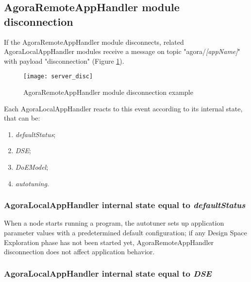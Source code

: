 \subsection{AgoraRemoteAppHandler module disconnection}\label{handler_disc}

If the AgoraRemoteAppHandler module disconnects, related AgoraLocalAppHandler modules receive a message on topic "agora\slash{}\textit{[appName]}" with payload "disconnection" (Figure \ref{fig::remDisc}).

\begin{figure}[htb]

    \centering
    \texttt{[image: server\_disc]}
    \caption{AgoraRemoteAppHandler module disconnection example}

    \label{fig::remDisc}
    
\end{figure}

Each AgoraLocalAppHandler reacts to this event according to its internal state, that can be:

\begin{enumerate}

    \item \textit{defaultStatus};
    
    \item \textit{DSE};
    
    \item \textit{DoEModel};
    
    \item \textit{autotuning}.

\end{enumerate}


\subsubsection{AgoraLocalAppHandler internal state equal to \textit{defaultStatus}}

When a node starts running a program, the autotuner sets up application parameter values with a predetermined default configuration; if any Design Space Exploration phase has not been started yet, AgoraRemoteAppHandler disconnection does not affect application behavior.


\subsubsection{AgoraLocalAppHandler internal state equal to \textit{DSE}}

